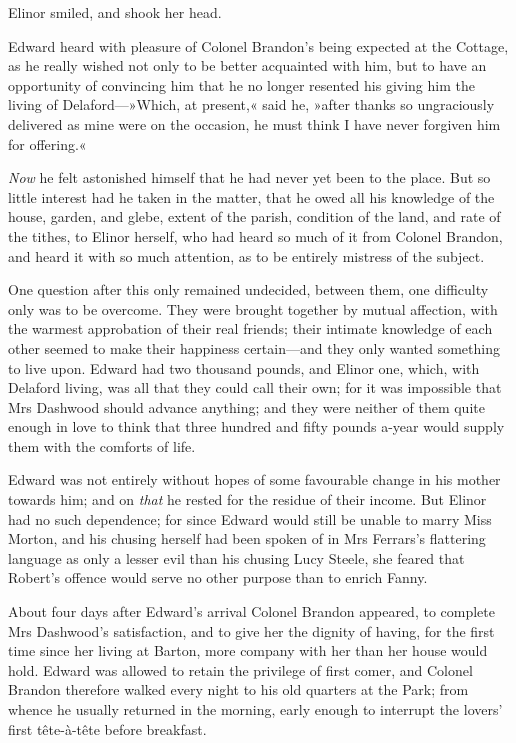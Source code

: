 Elinor smiled, and shook her head.

Edward heard with pleasure of Colonel Brandon’s being expected at the Cottage, as he really wished not only to be better acquainted with him, but to have an opportunity of convincing him that he no longer resented his giving him the living of Delaford—»Which, at present,« said he, »after thanks so ungraciously delivered as mine were on the occasion, he must think I have never forgiven him for offering.«

\textit{Now} he felt astonished himself that he had never yet been to the place. But so little interest had he taken in the matter, that he owed all his knowledge of the house, garden, and glebe, extent of the parish, condition of the land, and rate of the tithes, to Elinor herself, who had heard so much of it from Colonel Brandon, and heard it with so much attention, as to be entirely mistress of the subject.

One question after this only remained undecided, between them, one difficulty only was to be overcome. They were brought together by mutual affection, with the warmest approbation of their real friends; their intimate knowledge of each other seemed to make their happiness certain—and they only wanted something to live upon. Edward had two thousand pounds, and Elinor one, which, with Delaford living, was all that they could call their own; for it was impossible that Mrs Dashwood should advance anything; and they were neither of them quite enough in love to think that three hundred and fifty pounds a-year would supply them with the comforts of life.

Edward was not entirely without hopes of some favourable change in his mother towards him; and on \textit{that} he rested for the residue of their income. But Elinor had no such dependence; for since Edward would still be unable to marry Miss Morton, and his chusing herself had been spoken of in Mrs Ferrars’s flattering language as only a lesser evil than his chusing Lucy Steele, she feared that Robert’s offence would serve no other purpose than to enrich Fanny.

About four days after Edward’s arrival Colonel Brandon appeared, to complete Mrs Dashwood’s satisfaction, and to give her the dignity of having, for the first time since her living at Barton, more company with her than her house would hold. Edward was allowed to retain the privilege of first comer, and Colonel Brandon therefore walked every night to his old quarters at the Park; from whence he usually returned in the morning, early enough to interrupt the lovers’ first tête-à-tête before breakfast.

